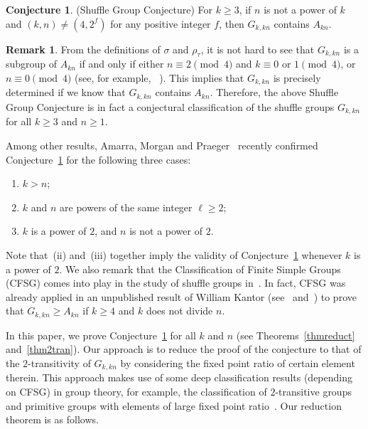 \documentclass[11pt,a4paper,reqno]{amsart}
\newcommand{\A}{A}
\theoremstyle{definition}
\newtheorem{conjecture}[theorem]{Conjecture}
\newtheorem*{remark}{Remark}
\begin{document}
\begin{conjecture}\label{conk}
(Shuffle Group Conjecture) For $k\geq3$, if $n$ is not a power of $k$ and $(k,n)\neq(4,2^f)$ for any positive integer $f$, then $G_{k,kn}$ contains $\A_{kn}$.
\end{conjecture}

\begin{remark}
From the definitions of $\sigma$ and $\rho_\tau$, it is not hard to see that $G_{k,kn}$ is a subgroup of $\A_{kn}$ if and only if either $n\equiv2\pmod4$ and $k\equiv0$ or $1\pmod4$, or $n\equiv0\pmod4$ (see, for example, ~\cite[Theorem~1]{MM1987}). This implies that $G_{k,kn}$ is precisely determined if we know that $G_{k,kn}$ contains $\A_{kn}$. Therefore, the above Shuffle Group Conjecture is in fact a conjectural classification of the shuffle groups $G_{k,kn}$ for all $k\geq3$ and $n\geq1$.
\end{remark}

Among other results, Amarra, Morgan and Praeger~\cite{AMP2021} recently confirmed Conjecture~\ref{conk} for the following three cases:
\begin{enumerate}[\rm(i)]
\item $k>n$;
\item $k$ and $n$ are powers of the same integer $\ell\geq2$;
\item $k$ is a power of $2$, and $n$ is not a power of $2$.\label{state}
\end{enumerate}
Note that~(ii) and~(iii) together imply the validity of Conjecture~\ref{conk} whenever $k$ is a power of $2$.
We also remark that the Classification of Finite Simple Groups (CFSG) comes into play in the study of shuffle groups in~\cite{AMP2021}. In fact, CFSG was already applied in an unpublished result of William Kantor (see~\cite{K} and~\cite[Page~13]{MM1987}) to prove that $G_{k,kn}\geq A_{kn}$ if $k\geq 4$ and $k$ does not divide $n$.

In this paper, we prove Conjecture~\ref{conk} for all $k$ and $n$ (see Theorems~\ref{thmreduct} and~\ref{thm2tran}). Our approach is to reduce the proof of the conjecture to that of the $2$-transitivity of $G_{k,kn}$ by considering the fixed point ratio of certain element therein. This approach makes use of some deep classification results (depending on CFSG) in group theory, for example, the classification of $2$-transitive groups and primitive groups with elements of large fixed point ratio~\cite{Burness2018,GM1998,LS1991}. Our reduction theorem is as follows.
\end{document}
